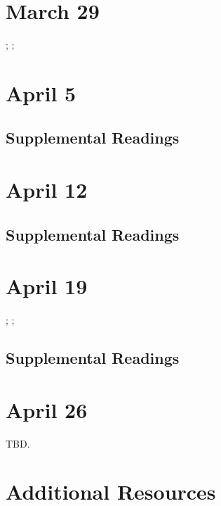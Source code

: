 \documentclass[11pt]{article}
\begin{document}
\cite{Pascoe:2011cj}

\section{March 29}

\cite{Cohn:1993wq}; \cite{Nafus:2012gg}; \cite{Reagle:2012vr}


\section{April 5 }

\cite{Cassell:2000vw}

\subsection{Supplemental Readings}
\cite{Burrill2008}

\section{April 12}

\cite{Kafai:2008wl}

\subsection{Supplemental Readings}
\cite{Shaw:2015dr}


\section{April 19}

\cite{Gaboury:2015uv}; \cite{Nooney:2013vu}; \cite{Wu:2007gs}

\subsection{Supplemental Readings}
\cite{Ruberg:2017ww}

\section{April 26}

TBD.

\newpage
\section{Additional Resources}
\nocite{*} 
\printbibliography
\end{document}
